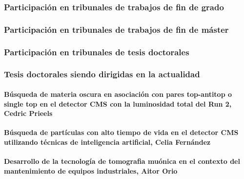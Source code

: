 \documentclass[a4paper, 11pt, twoside, openright]{report}
\begin{document}
\subsubsection{Participación en tribunales de trabajos de fin de grado}


\subsubsection{Participación en tribunales de trabajos de fin de máster}


\subsubsection{Participación en tribunales de tesis doctorales}



\subsubsection{Tesis doctorales siendo dirigidas en la actualidad}

\paragraph{Búsqueda de materia oscura en asociación con pares top-antitop o single top en el detector CMS con la luminosidad total del Run 2, Cedric Prieels}


\paragraph{Búsqueda de partículas con alto tiempo de vida en el detector CMS utilizando técnicas de inteligencia artificial, Celia Fernández}


\paragraph{Desarrollo de la tecnología de tomografia muónica en el contexto del mantenimiento de equipos industriales, Aitor Orio}

\end{document}

